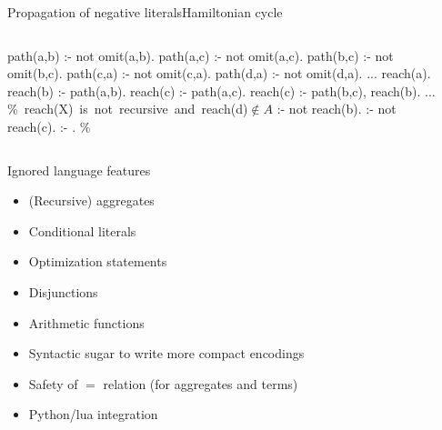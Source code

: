 \begin{frame}{Propagation of negative literals}{Hamiltonian cycle}
  \medskip
  \begin{columns}
    \begin{column}{0.45\textwidth}
    \begin{minipage}{.4\textwidth}\small
      \begin{semiverbatim}
path(a,b) :- not omit(a,b).
path(a,c) :- not omit(a,c).
path(b,c) :- not omit(b,c).
path(c,a) :- not omit(c,a).
path(d,a) :- not omit(d,a).
...
\alert{reach(a)}.
\alert{reach(b)} :- path(a,b).
\alert{reach(c)} :- path(a,c).
\alert{reach(c)} :- path(b,c), reach(b).
...
\mbox{{\color{comment}\% reach(X) is not recursive and reach(d)\({}\not\in{}A\)}}
:- not reach(b).
:- not reach(c).
:- . \color{comment}\% 
      \end{semiverbatim}
    \end{minipage}
    \end{column}
    \begin{column}[t]{0.45\textwidth}
      \centering
      \Graph[draw=none]
    \end{column}
  \end{columns}
\end{frame}
\begin{frame}{Ignored language features}
  \bigskip
  \begin{itemize}
  \item (Recursive) aggregates
  \item Conditional literals
  \item Optimization statements
  \item Disjunctions
  \item Arithmetic functions
  \item Syntactic sugar to write more compact encodings
  \item Safety of \(=\) relation (for aggregates and terms)
  \item Python/lua integration
  \end{itemize}
\end{frame}
%
